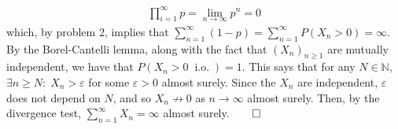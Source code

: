 \documentclass[10pt]{article}
\newcommand{\mbb}[1]{\mathbb{#1}}
\newcommand{\1}[1]{\mathbbm{1}_{#1}}
\DeclareMathOperator{\io}{i.o.}
\begin{document}
    \begin{align*}
        \prod_{i=1}^\infty p=\lim_{n\rightarrow\infty}p^n=0
    \end{align*}
    which, by problem 2, implies that $\sum_{n=1}^\infty(1-p)=\sum_{n=1}^\infty P(X_n>0)=\infty$. By the Borel-Cantelli lemma, along with the fact that $(X_n)_{n\geq1}$ are mutually independent, we have that
    $P(X_n>0\;\io)=1$. This says that for any $N\in\mbb{N}$, $\exists n\geq N:\;X_n>\varepsilon$ for some $\varepsilon>0$ almost surely. Since the $X_n$ are independent, $\varepsilon$ does not depend on $N$, and so $X_n\nrightarrow 0$ as $n\rightarrow\infty$ almost surely. Then, by the divergence test, $\sum_{n=1}^\infty X_n=\infty$ almost surely.\hfill{$\qed$}\\[5pt]
\end{document}
